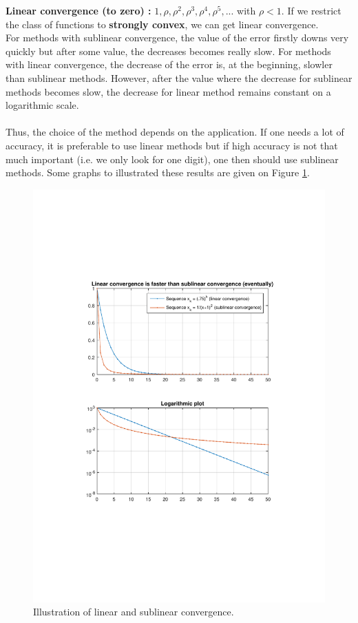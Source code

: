 \textbf{Linear convergence (to zero) :} $1, \rho, \rho ^2, \rho ^3, \rho ^4, \rho ^5, ... $ with $\rho < 1$. If we restrict the class of functions to \textbf{strongly convex}, we can get linear convergence.\\


 For methods with sublinear convergence, the value of the error firstly downs very quickly but after some value, the decreases becomes really slow. For methods with linear convergence, the decrease of the error is, at the beginning, slowler than sublinear methods. However, after the value where the decrease for sublinear methods becomes slow, the decrease for linear method remains constant on a logarithmic scale. \\ \\ Thus, the choice of the method depends on the application. If one needs a lot of accuracy, it is preferable to use linear methods but if high accuracy is not that much important (i.e. we only look for one digit), one then should use sublinear methods. Some graphs to illustrated these results are given on Figure \ref{fig:linear_convergence}.

\begin{figure}
\centering
\includegraphics[width=\linewidth]{images/L6-Linear_convergence.pdf} 
\caption{Illustration of linear and sublinear convergence.}
\label{fig:linear_convergence}
\end{figure}

%
